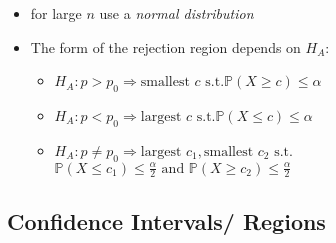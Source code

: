 \begin{itemize}
    \item for large $n$ use a \textit{normal distribution}
    \item The form of the rejection region depends on $H_A$:
          \begin{itemize}
              \item $H_A: p>p_0 \Rightarrow \text{smallest }c\text{ s.t.} \mathbb{P}(X\geq c)\leq \alpha$
              \item $H_A: p<p_0 \Rightarrow \text{largest }c\text{ s.t.} \mathbb{P}(X\leq c)\leq \alpha$
              \item $H_A: p\neq p_0 \Rightarrow \text{largest } c_1, \text{smallest }c_2 \text{ s.t.}$\newline
                    $ \mathbb{P}(X\leq c_1)\leq \frac{\alpha}{2} \text{ and }\mathbb{P}(X\geq c_2)\leq \frac{\alpha}{2}$
          \end{itemize}
\end{itemize}

\subsection{Confidence Intervals/ Regions}